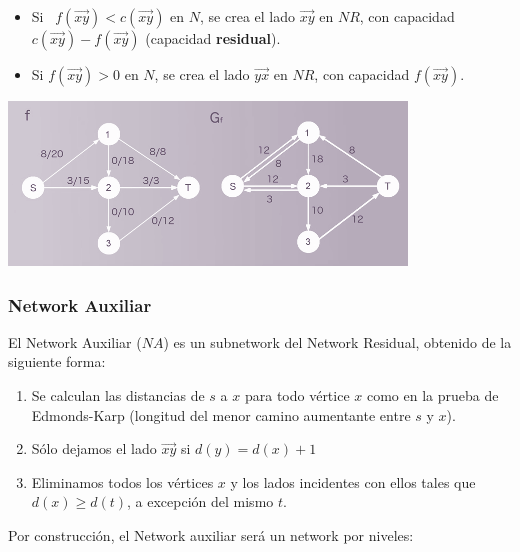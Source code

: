 \documentclass[10pt,a4paper]{article}
\begin{document}
\begin{itemize}

	\item Si  $f(\overrightarrow{xy}) < c(\overrightarrow{xy}) $ en $N$, se crea el lado $\overrightarrow{xy}$ en $NR$, con capacidad $c(\overrightarrow{xy}) - f(\overrightarrow{xy})$ (capacidad \textbf{residual}).
	\item Si $f(\overrightarrow{xy}) > 0$ en $N$, se crea el lado $\overrightarrow{yx}$ en $NR$, con capacidad $f(\overrightarrow{xy})$.
\end{itemize}

\begin{center}

    \begin{adjustbox}{max size={\textwidth}{\textheight}}
        \includegraphics{definitions/NR.png}
        \end{adjustbox}
    
\end{center}

\subsubsection*{Network Auxiliar}

El Network Auxiliar ($NA$) es un subnetwork del Network Residual, obtenido de la siguiente forma:

\begin{enumerate}

	\item Se calculan las distancias de $s$ a $x$ para todo vértice $x$ como en la prueba de Edmonds-Karp (longitud del menor camino aumentante entre $s$ y $x$).
	\item Sólo dejamos el lado $\overrightarrow{xy}$ si $d(y) = d(x) + 1$
	\item Eliminamos todos los vértices $x$ y los lados incidentes con ellos tales que $d(x) \geq d(t)$, a excepción del mismo $t$.
\end{enumerate}

Por construcción, el Network auxiliar será un network por niveles:
\end{document}
